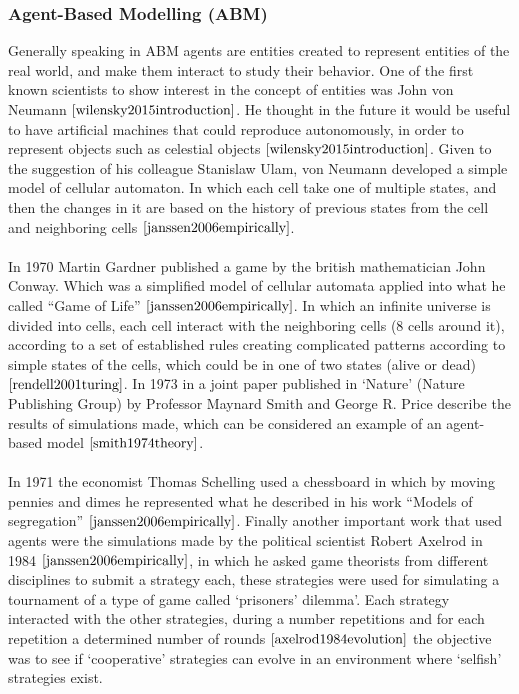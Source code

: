 \subsubsection{Agent-Based Modelling (ABM)}
Generally speaking in ABM agents are entities created to represent entities of the real world, and make them interact to study their behavior. One of the first known scientists to show interest in the concept of entities was John von Neumann $\cite{wilensky2015introduction}$. He thought in the future it would be useful to have artificial machines that could reproduce autonomously, in order to represent objects such as celestial objects $\cite{wilensky2015introduction}$. Given to the suggestion of his colleague Stanislaw Ulam, von Neumann developed a simple model of cellular automaton. In which each cell take one of multiple states, and then the changes in it are based on the history of previous states from the cell and neighboring cells $\cite{janssen2006empirically}$.
\\\\In 1970 Martin Gardner published a game by the british mathematician John Conway. Which was a simplified model of cellular automata applied into what he called “Game of Life” $\cite{janssen2006empirically}$. In which an infinite universe is divided into cells, each cell interact with the neighboring cells (8 cells around it), according to a set of established rules creating complicated patterns according to simple states of the cells, which could be in one of two states (alive or dead) $\cite{rendell2001turing}$. In 1973 in a joint paper published in `Nature' (Nature Publishing Group)  by Professor Maynard Smith and George R. Price describe the results of simulations made, which can be considered an example of an agent-based model $\cite{smith1974theory}$.
\\\\In 1971 the economist Thomas Schelling used a chessboard in which by moving pennies and dimes he represented what he described in his work ``Models of segregation'' $\cite{janssen2006empirically}$.  Finally another important work that used agents were the simulations made by the political scientist Robert Axelrod in 1984 $\cite{janssen2006empirically}$, in which he asked game theorists from different disciplines to submit a strategy each, these strategies were used for simulating a tournament of a type of game called `prisoners’ dilemma'. Each strategy interacted with the other strategies, during a number repetitions and for each repetition  a determined number of rounds $\cite{axelrod1984evolution}$ the objective was to see if `cooperative' strategies can evolve in an environment where `selfish' strategies exist.
